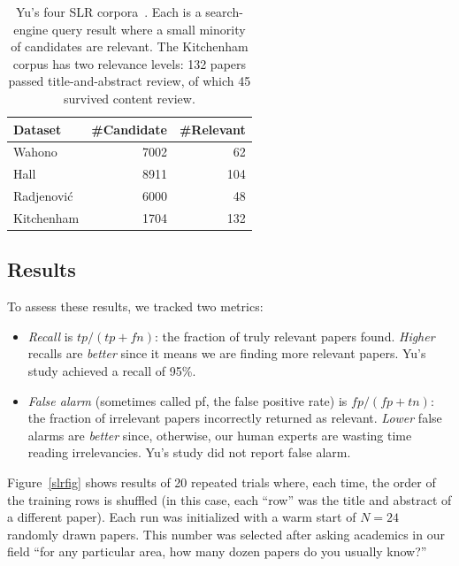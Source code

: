 \documentclass[AMA,STIX2COL]{WileyNJDv5}
\begin{document}
{{\begin{table}[!t]
\caption{Yu's four SLR corpora~\cite{yu2018total}. Each is a
search-engine query result where a small minority of candidates
are relevant. The Kitchenham corpus has two relevance levels:
132 papers passed title-and-abstract review, of which 45
survived content review.}
\label{slr}
\begin{center}
\footnotesize
\begin{tabular}{lrr}
\hline
Dataset & \#Candidate & \#Relevant \\
\hline
Wahono       & 7002 & 62 \\
Hall         & 8911 & 104 \\
Radjenovi\'c & 6000 & 48 \\
Kitchenham   & 1704 & 132 \\
\hline
\end{tabular}
\end{center}
\end{table}

\subsection{Results}
To assess these results, we tracked
 two metrics:
 \begin{itemize}
 \item

\textit{Recall} is $\mathit{tp}/(\mathit{tp} + \mathit{fn})$:
the fraction of truly relevant papers found. 
{\em Higher} recalls are {\em better} since it means we are finding
more relevant papers.
  Yu's study achieved a recall of  95\%.
\item
\textit{False alarm} (sometimes called pf, the false positive
rate) is $\mathit{fp}/(\mathit{fp} + \mathit{tn})$: the fraction
of irrelevant papers incorrectly returned as relevant. 
{\em Lower} false alarms are {\em better} since, otherwise,
our human experts are wasting time reading irrelevancies.
Yu's study did not report false alarm.
\end{itemize}
 







 Figure~\ref{slrfig} shows results of 20 repeated trials where,
each time, the order of the training rows is shuffled
(in this case, each ``row'' was the title and abstract of a different paper).
Each run was initialized with a warm start of $N=24$ randomly drawn papers. 
This number was selected after asking academics in our field ``for any particular area, how many dozen papers do you usually
know?''

}}
\end{document}
